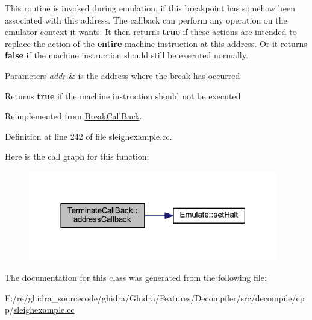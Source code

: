 This routine is invoked during emulation, if this breakpoint has somehow been associated with this address. The callback can perform any operation on the emulator context it wants. It then returns {\bfseries{true}} if these actions are intended to replace the action of the {\bfseries{entire}} machine instruction at this address. Or it returns {\bfseries{false}} if the machine instruction should still be executed normally. 
\begin{DoxyParams}{Parameters}
{\em addr} & is the address where the break has occurred \\
\hline
\end{DoxyParams}
\begin{DoxyReturn}{Returns}
{\bfseries{true}} if the machine instruction should not be executed 
\end{DoxyReturn}


Reimplemented from \mbox{\hyperlink{class_break_call_back_adb97ba6b111cb9a84856c9e0f9d506f9}{Break\+Call\+Back}}.



Definition at line 242 of file sleighexample.\+cc.

Here is the call graph for this function\+:
\nopagebreak
\begin{figure}[H]
\begin{center}
\leavevmode
\includegraphics[width=309pt]{class_terminate_call_back_a5e6e9e130ebb01d929d70022069da60e_cgraph}
\end{center}
\end{figure}


The documentation for this class was generated from the following file\+:\begin{DoxyCompactItemize}
\item 
F\+:/re/ghidra\+\_\+sourcecode/ghidra/\+Ghidra/\+Features/\+Decompiler/src/decompile/cpp/\mbox{\hyperlink{sleighexample_8cc}{sleighexample.\+cc}}\end{DoxyCompactItemize}
